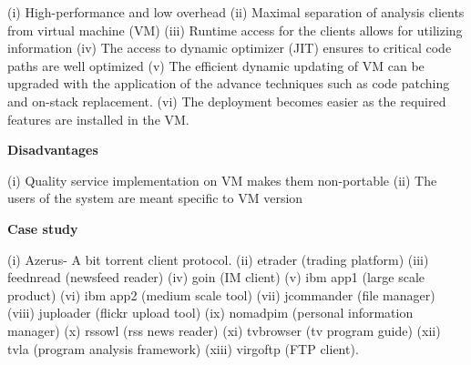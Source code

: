 \begin{compactitem}
(i)	High-performance and low overhead
(ii)	Maximal separation of analysis clients from virtual machine (VM)
(iii)	Runtime access for the clients allows for utilizing information
(iv)	The access to dynamic optimizer (JIT) ensures to critical code paths are well optimized
(v)	The efficient dynamic updating of VM can be upgraded with the application of the advance techniques such as code patching and on-stack replacement.  
(vi)	The deployment becomes easier as the required features are installed in the VM.


\item[\textbf{Disadvantages}] 

(i)	    Quality service implementation on VM makes them non-portable
(ii)	The users of the system are meant specific to VM version

\item[\textbf{Case study}] 

(i)	Azerus- A bit torrent client protocol.
(ii) etrader (trading platform) (iii) feednread (newsfeed reader) (iv) goin (IM client) (v) ibm app1 (large scale product) (vi) ibm app2 (medium scale tool) (vii) jcommander (file manager) (viii) juploader (flickr upload tool) (ix) nomadpim (personal information manager) (x) rssowl (rss news reader) (xi) tvbrowser (tv program guide) (xii) tvla (program analysis framework) (xiii) virgoftp (FTP client). 

\end{compactitem}
